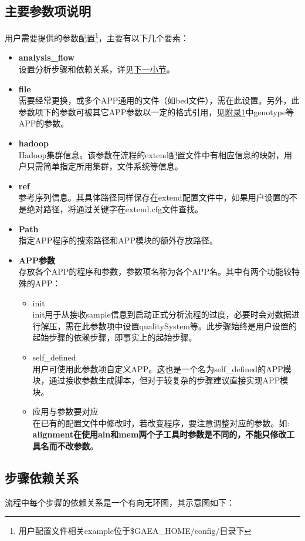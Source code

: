 \documentclass[UTF8,10pt,a4paper]{ctexart}
\begin{document}
\subsection{主要参数项说明}
用户需要提供的参数配置\footnote{用户配置文件相关example位于\$GAEA\_HOME/config/目录下}，主要有以下几个要素：
\begin{itemize}
\item \textbf{analysis\_flow}\\
设置分析步骤和依赖关系，详见{\kaishu \hyperref[subs5.3]{下一小节}}。
\item \textbf{file}\\
需要经常更换，或多个APP通用的文件（如bed文件），需在此设置。另外，此参数项下的参数可被其它APP参数以一定的格式引用，见{\kaishu \hyperref[B]{附录1}}中genotype等APP的参数。
\item \textbf{hadoop}\\
Hadoop集群信息。该参数在流程的extend配置文件中有相应信息的映射，用户只需简单指定所用集群，文件系统等信息。
\item \textbf{ref}\\
参考序列信息。其具体路径同样保存在extend配置文件中，如果用户设置的不是绝对路径，将通过关键字在extend.cfg文件查找。
\item \textbf{Path}\\
指定APP程序的搜索路径和APP模块的额外存放路径。
\item \textbf{APP参数}\\
存放各个APP的程序和参数，参数项名称为各个APP名。其中有两个功能较特殊的APP：
\begin{itemize}
\item  init \\
init用于从接收sample信息到启动正式分析流程的过度，必要时会对数据进行解压，需在此参数项中设置qualitySystem等。此步骤始终是用户设置的起始步骤的依赖步骤，即事实上的起始步骤。
\item  self\_defined \\
用户可使用此参数项自定义APP。这也是一个名为self\_defined的APP模块，通过接收参数生成脚本，但对于较复杂的步骤建议直接实现APP模块。
\item  应用与参数要对应 \\
在已有的配置文件中修改时，若改变程序，要注意调整对应的参数。如: {\kaishu\textbf{alignment在使用aln和mem两个子工具时参数是不同的，不能只修改工具名而不改参数}}。
\end{itemize}

\end{itemize}


\subsection{步骤依赖关系}
\label{subs5.3}
流程中每个步骤的依赖关系是一个有向无环图，其示意图如下：%
\end{document}
